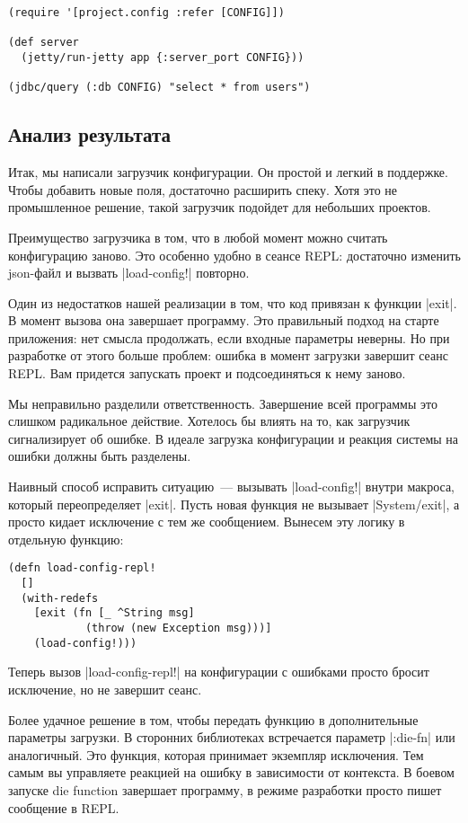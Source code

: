 \begin{verbatim}
(require '[project.config :refer [CONFIG]])

(def server
  (jetty/run-jetty app {:server_port CONFIG}))

(jdbc/query (:db CONFIG) "select * from users")
\end{verbatim}

\subsection{Анализ результата}

Итак, мы написали загрузчик конфигурации. Он простой и легкий в поддержке. Чтобы
добавить новые поля, достаточно расширить спеку. Хотя это не промышленное
решение, такой загрузчик подойдет для небольших проектов.

Преимущество загрузчика в том, что в любой момент можно считать конфигурацию
заново. Это особенно удобно в сеансе REPL: достаточно изменить json-файл и
вызвать \spverb|load-config!| повторно.

Один из недостатков нашей реализации в том, что код привязан к функции \spverb|exit|. В
момент вызова она завершает программу. Это правильный подход на старте
приложения: нет смысла продолжать, если входные параметры неверны. Но при
разработке от этого больше проблем: ошибка в момент загрузки завершит сеанс
REPL. Вам придется запускать проект и подсоединяться к нему заново.

Мы неправильно разделили ответственность. Завершение всей программы это слишком
радикальное действие. Хотелось бы влиять на то, как загрузчик сигнализирует об
ошибке. В идеале загрузка конфигурации и реакция системы на ошибки должны быть
разделены.

Наивный способ исправить ситуацию~--- вызывать \spverb|load-config!| внутри макроса,
который переопределяет \spverb|exit|. Пусть новая функция не вызывает \spverb|System/exit|, а
просто кидает исключение с тем же сообщением. Вынесем эту логику в отдельную
функцию:

\begin{verbatim}
(defn load-config-repl!
  []
  (with-redefs
    [exit (fn [_ ^String msg]
            (throw (new Exception msg)))]
    (load-config!)))
\end{verbatim}

Теперь вызов \spverb|load-config-repl!| на конфигурации с ошибками просто бросит
исключение, но не завершит сеанс.

Более удачное решение в том, чтобы передать функцию в дополнительные параметры
загрузки. В сторонних библиотеках встречается параметр \spverb|:die-fn| или
аналогичный. Это функция, которая принимает экземпляр исключения. Тем самым вы
управляете реакцией на ошибку в зависимости от контекста. В боевом запуске die
function завершает программу, в режиме разработки просто пишет сообщение в REPL.

